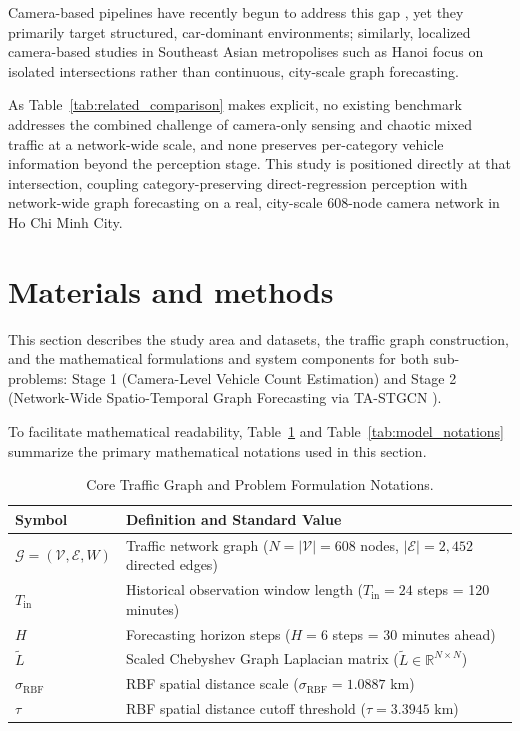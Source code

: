 \documentclass[preprint,12pt]{elsarticle}
\begin{document}
Camera-based pipelines have recently begun to address this gap \citep{feng2024, liu2024}, yet they primarily target structured, car-dominant environments; similarly, localized camera-based studies in Southeast Asian metropolises such as Hanoi \citep{vu2026} focus on isolated intersections rather than continuous, city-scale graph forecasting.


As Table~\ref{tab:related_comparison} makes explicit, no existing benchmark addresses the combined challenge of camera-only sensing and chaotic mixed traffic at a network-wide scale, and none preserves per-category vehicle information beyond the perception stage. This study is positioned directly at that intersection, coupling category-preserving direct-regression perception with network-wide graph forecasting on a real, city-scale 608-node camera network in Ho Chi Minh City.

\section{Materials and methods}
\label{sec:methods}

This section describes the study area and datasets, the traffic graph construction, and the mathematical formulations and system components for both sub-problems: Stage 1 (Camera-Level Vehicle Count Estimation) and Stage 2 (Network-Wide Spatio-Temporal Graph Forecasting via TA-STGCN \citep{stgcn, attention}). 

To facilitate mathematical readability, Table~\ref{tab:graph_notations} and Table~\ref{tab:model_notations} summarize the primary mathematical notations used in this section.

\begin{table}[ht]
\centering
\footnotesize
\setlength{\tabcolsep}{2pt}
\renewcommand{\arraystretch}{1.1}
\caption{Core Traffic Graph and Problem Formulation Notations.}
\label{tab:graph_notations}
\begin{tabular}{ll}
\toprule
\textbf{Symbol} & \textbf{Definition and Standard Value} \\
\midrule
$\mathcal{G} = (\mathcal{V}, \mathcal{E}, W)$ & Traffic network graph ($N = |\mathcal{V}| = 608$ nodes, $|\mathcal{E}| = 2,452$ directed edges) \\
$T_{\text{in}}$ & Historical observation window length ($T_{\text{in}} = 24$ steps = 120 minutes) \\
$H$ & Forecasting horizon steps ($H = 6$ steps = 30 minutes ahead) \\
$\tilde{L}$ & Scaled Chebyshev Graph Laplacian matrix ($\tilde{L} \in \mathbb{R}^{N \times N}$) \\
$\sigma_{\mathrm{RBF}}$ & RBF spatial distance scale ($\sigma_{\mathrm{RBF}} = 1.0887$ km) \\
$\tau$ & RBF spatial distance cutoff threshold ($\tau = 3.3945$ km) \\
\bottomrule
\end{tabular}%
\end{table}
\end{document}
